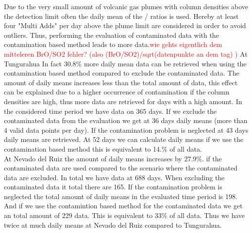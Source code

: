 \documentclass  [
  paper    = a4,
  BCOR     = 10mm,
  twoside,
  fontsize = 12pt,
  fleqn,
  toc      = bibnumbered,
  toc      = listofnumbered,
  numbers  = noendperiod,
  headings = normal,
  listof   = leveldown,
  version  = 3.03
]                                       {scrreprt}
\begin{document}
	 Due to the very small amount of volcanic gas plumes with 
	  column densities above the detection limit often the daily mean of the /  ratios is used. Hereby at least four "Multi Adds" per day above the plume limit are considered in order to avoid outliers. Thus, performing the evaluation of contaminated data with the contamination based method leads to more data.\textcolor{red}{wie gehts eigentlich dem mitteleren BrO/SO2 fehler? (also (BrO/SO2)/sqrt(datenpunkte an dem tag) )}
	At Tungurahua In fact 30.8\% more daily mean data can be retrieved when using the contamination based method compared to exclude the contaminated data. The amount of daily means increases less than the total amount of data, this effect can be explained due to a higher occurrence of contamination if the   column densities are high, thus more data are retrieved for days with a high   amount.
	In the considered time period we have data on 365 days. 
	If we exclude the contaminated data from the evaluation we get at 36 days daily means (more than 4 valid data points per day). If the contamination problem is neglected at 43 days daily means are retrieved. At 52 days we can calculate daily means if we use the contamination based method this is equivalent to 14.\% of all data.\\

	At Nevado del Ruiz the amount of daily means increases by 27.9\%. if the contaminated data are used compared to the scenario where the contaminated data are excluded.
	In total we have data at 688 days.	When excluding the contaminated data it total there are 165.
	If the contamination problem is neglected the total amount of daily means in the evaluated time period is 198. And if we use the contamintion based method for the contaminated data we get an total amount of 229 data. This is  equivalent to 33\% of all data. Thus we have twice at much daily means at Nevado del Ruiz compared to Tungurahua.
	
\end{document}
